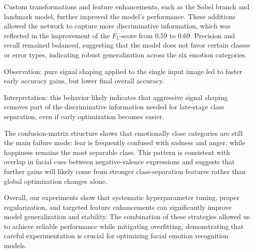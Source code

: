 Custom transformations and feature enhancements, such as the Sobel branch and landmark model, further improved the model’s performance. These additions allowed the network to capture more discriminative information, which was reflected in the improvement of the \( F_1 \)-score from \( 0.59 \) to \( 0.69 \). Precision and recall remained balanced, suggesting that the model does not favor certain classes or error types, indicating robust generalization across the six emotion categories.
\vspace{0.35em}

Observation: pure signal shaping applied to the single input image led to faster early accuracy gains, but lower final overall accuracy.

Interpretation: this behavior likely indicates that aggressive signal shaping removes part of the discriminative information needed for late-stage class separation, even if early optimization becomes easier.
\vspace{0.35em}

The confusion-matrix structure shows that emotionally close categories are still the main failure mode: fear is frequently confused with sadness and anger, while happiness remains the most separable class. This pattern is consistent with overlap in facial cues between negative-valence expressions and suggests that further gains will likely come from stronger class-separation features rather than global optimization changes alone.
\vspace{0.35em}

Overall, our experiments show that systematic hyperparameter tuning, proper regularization, and targeted feature enhancements can significantly improve model generalization and stability. The combination of these strategies allowed us to achieve reliable performance while mitigating overfitting, demonstrating that careful experimentation is crucial for optimizing facial emotion recognition models.
